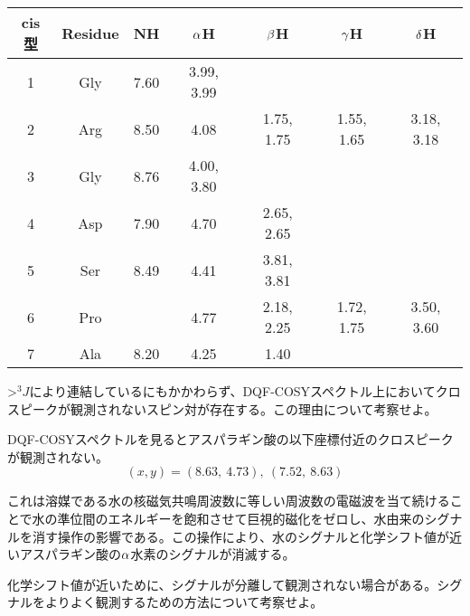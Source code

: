 \documentclass[a4paper,papersize,dvipdfmx]{jsarticle}
\begin{document}
\begin{table}[H]
\begin{center}
\begin{tabular}{|c|c|c|c|c|c|c|}
\hline
cis型 & Residue & NH   & $\rm \alpha$H        & $\rm \beta$H        & $\rm \gamma$H        & $\rm \delta$H          \\ \hline
1 & Gly     & 7.60 & 3.99, 3.99 &            &            &            \\ \hline
2 & Arg     & 8.50 & 4.08       & 1.75, 1.75 & 1.55, 1.65 & 3.18, 3.18 \\ \hline
3 & Gly     & 8.76 & 4.00, 3.80 &            &            &            \\ \hline
4 & Asp     & 7.90 & 4.70       & 2.65, 2.65 &            &            \\ \hline
5 & Ser     & 8.49 & 4.41       & 3.81, 3.81 &            &            \\ \hline
6 & Pro     &      & 4.77       & 2.18, 2.25 & 1.72, 1.75 & 3.50, 3.60 \\ \hline
7 & Ala     & 8.20 & 4.25       & 1.40       &            &            \\ \hline
\end{tabular}
\end{center}
\end{table}


\begin{tcolorbox}[colback=white,colbacktitle=black!10!white,coltitle=black,title={2}]
>$^3J$により連結しているにもかかわらず、DQF-COSYスペクトル上においてクロスピークが観測されないスピン対が存在する。この理由について考察せよ。
\end{tcolorbox}

DQF-COSYスペクトルを見るとアスパラギン酸の以下座標付近のクロスピークが観測されない。
\[(x,y) = (8.63, \ 4.73) , \ (7.52, \ 8.63)\]

これは溶媒である水の核磁気共鳴周波数に等しい周波数の電磁波を当て続けることで水の準位間のエネルギーを飽和させて巨視的磁化をゼロし、水由来のシグナルを消す操作の影響である。この操作により、水のシグナルと化学シフト値が近いアスパラギン酸の$\rm \alpha$水素のシグナルが消滅する。



\begin{tcolorbox}[colback=white,colbacktitle=black!10!white,coltitle=black,title={3}]
化学シフト値が近いために、シグナルが分離して観測されない場合がある。シグナルをよりよく観測するための方法について考察せよ。
\end{tcolorbox}
\end{document}
